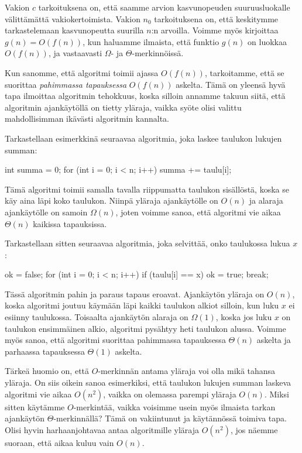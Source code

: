 Vakion $c$ tarkoituksena on, että saamme arvion kasvunopeuden suuruusluokalle välittämättä
vakiokertoimista. Vakion $n_0$ tarkoituksena on, että keskitymme tarkastelemaan
kasvunopeutta suurilla $n$:n arvoilla.
Voimme myös kirjoittaa $g(n)=O(f(n))$, kun haluamme ilmaista,
että funktio $g(n)$ on luokkaa $O(f(n))$,
ja vastaavasti $\Omega$- ja $\Theta$-merkinnöissä.

Kun sanomme, että algoritmi toimii ajassa $O(f(n))$, tarkoitamme, että se suorittaa
\emph{pahimmassa tapauksessa} $O(f(n))$ askelta.
Tämä on yleensä hyvä tapa ilmoittaa algoritmin tehokkuus,
koska silloin annamme takuun siitä, että algoritmin ajankäytöllä on tietty yläraja,
vaikka syöte olisi valittu mahdollisimman ikävästi algoritmin kannalta.

Tarkastellaan esimerkkinä seuraavaa algoritmia, joka laskee
taulukon lukujen summan:

\begin{code}
int summa = 0;
for (int i = 0; i < n; i++) {
    summa += taulu[i];
}
\end{code}

Tämä algoritmi toimii samalla tavalla riippumatta taulukon sisällöstä,
koska se käy aina läpi koko taulukon.
Niinpä yläraja ajankäytölle on $O(n)$ ja alaraja ajankäytölle on samoin $\Omega(n)$,
joten voimme sanoa, että algoritmi vie aikaa $\Theta(n)$ kaikissa tapauksissa.

Tarkastellaan sitten seuraavaa algoritmia, joka selvittää,
onko taulukossa lukua $x$:

\begin{code}
ok = false;
for (int i = 0; i < n; i++) {
    if (taulu[i] == x) {
        ok = true;
        break;
    }
}
\end{code}

Tässä algoritmin pahin ja paraus tapaus eroavat.
Ajankäytön yläraja on $O(n)$, koska algoritmi joutuu käymään
läpi kaikki taulukon alkiot silloin, kun luku $x$
ei esiinny taulukossa.
Toisaalta ajankäytön alaraja on $\Omega(1)$,
koska jos luku $x$ on taulukon ensimmäinen alkio,
algoritmi pysähtyy heti taulukon alussa.
Voimme myös sanoa, että algoritmi suorittaa pahimmassa
tapauksessa $\Theta(n)$ askelta ja parhaassa tapauksessa
$\Theta(1)$ askelta.

Tärkeä huomio on, että $O$-merkinnän antama yläraja voi olla mikä tahansa yläraja.
On siis oikein sanoa esimerkiksi, että taulukon lukujen summan
laskeva algoritmi vie aikaa $O(n^2)$, vaikka on olemassa parempi yläraja $O(n)$.
Miksi sitten käytämme $O$-merkintää, vaikka voisimme usein myös ilmaista tarkan
ajankäytön $\Theta$-merkinnällä?
Tämä on vakiintunut ja käytännössä toimiva tapa.
Olisi hyvin harhaanjohtavaa antaa algoritmille yläraja $O(n^2)$,
jos näemme suoraan, että aikaa kuluu vain $O(n)$.

